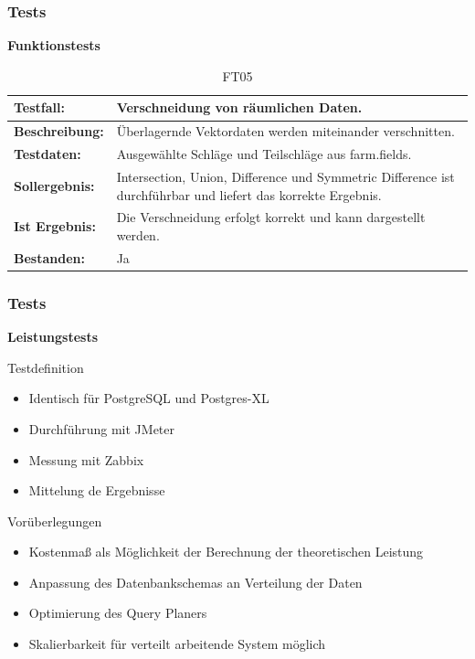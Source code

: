 \documentclass{beamer}
\begin{document}
\begin{frame}\frametitle{Tests}
\centering\textbf{Funktionstests}

\begin{table}[h!]
\centering
\small
\begin{tabular}{p{2.3cm}|p{7cm}}
\textbf{Testfall:} & Verschneidung von räumlichen Daten. \\ \hline
\textbf{Beschreibung:} & Überlagernde Vektordaten werden miteinander verschnitten. \\ \hline
\textbf{Testdaten:} & Ausgewählte Schläge und Teilschläge aus farm.fields. \\ \hline
\textbf{Sollergebnis:} & Intersection, Union, Difference und Symmetric Difference ist durchführbar und liefert das korrekte Ergebnis. \\ \hline
\textbf{Ist Ergebnis:} & Die Verschneidung erfolgt korrekt und kann dargestellt werden. \\ \hline
\textbf{Bestanden:} & Ja \\
\end{tabular}
\caption{FT05}
\end{table}
\end{frame}

\begin{frame}\frametitle{Tests}
\centering\textbf{Leistungstests}

\begin{block}{Testdefinition}
\begin{itemize}
\item Identisch für PostgreSQL und Postgres-XL
\item Durchführung mit JMeter
\item Messung mit Zabbix
\item Mittelung de Ergebnisse %
\end{itemize}
\end{block}

\begin{block}{Vorüberlegungen}
\begin{itemize}
\item Kostenmaß als Möglichkeit der Berechnung der theoretischen Leistung
\item Anpassung des Datenbankschemas an Verteilung der Daten
\item Optimierung des Query Planers
\item Skalierbarkeit für verteilt arbeitende System möglich
\end{itemize}
\end{block}
\end{frame}
\end{document}
